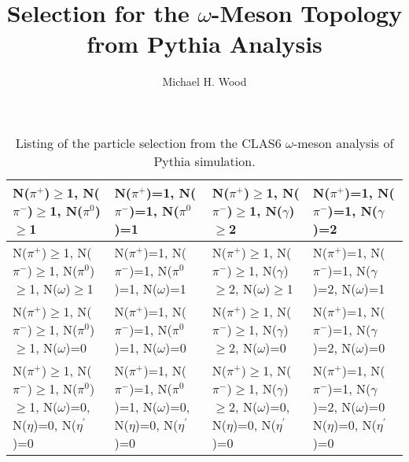 \documentclass[11pt, oneside]{article}   	%
\title{Selection for the $\omega$-Meson Topology from Pythia Analysis}
\author{Michael H. Wood}
\begin{document}
\maketitle

\begin{table}[htp]
\caption{Listing of the particle selection from the CLAS6 $\omega$-meson analysis of Pythia simulation.}
\begin{center}
\begin{tabular}{| p{2.5cm} | p{2.5cm} | p{2.5cm} | p{2.5cm} |}
\hline
N($\pi^{+}$)$\ge$1, N($\pi^{-}$)$\ge$1, N($\pi^{0}$)$\ge$1 & 
N($\pi^{+}$)=1, N($\pi^{-}$)=1, N($\pi^{0}$)=1 & 
N($\pi^{+}$)$\ge$1, N($\pi^{-}$)$\ge$1, N($\gamma$)$\ge$2 & 
N($\pi^{+}$)=1, N($\pi^{-}$)=1, N($\gamma$)=2 \\  \hline \hline

N($\pi^{+}$)$\ge$1, N($\pi^{-}$)$\ge$1, N($\pi^{0}$)$\ge$1, N($\omega$)$\ge$1 & 
N($\pi^{+}$)=1, N($\pi^{-}$)=1, N($\pi^{0}$)=1, N($\omega$)=1 & 
N($\pi^{+}$)$\ge$1, N($\pi^{-}$)$\ge$1, N($\gamma$)$\ge$2, N($\omega$)$\ge$1 & 
N($\pi^{+}$)=1, N($\pi^{-}$)=1, N($\gamma$)=2, N($\omega$)=1 \\  \hline \hline

N($\pi^{+}$)$\ge$1, N($\pi^{-}$)$\ge$1, N($\pi^{0}$)$\ge$1, N($\omega$)=0 & 
N($\pi^{+}$)=1, N($\pi^{-}$)=1, N($\pi^{0}$)=1, N($\omega$)=0 & 
N($\pi^{+}$)$\ge$1, N($\pi^{-}$)$\ge$1, N($\gamma$)$\ge$2, N($\omega$)=0 & 
N($\pi^{+}$)=1, N($\pi^{-}$)=1, N($\gamma$)=2, N($\omega$)=0 \\  \hline \hline

N($\pi^{+}$)$\ge$1, N($\pi^{-}$)$\ge$1, N($\pi^{0}$)$\ge$1, N($\omega$)=0, N($\eta$)=0, N($\eta^{\prime}$)=0 & 
N($\pi^{+}$)=1, N($\pi^{-}$)=1, N($\pi^{0}$)=1, N($\omega$)=0, N($\eta$)=0, N($\eta^{\prime}$)=0 & 
N($\pi^{+}$)$\ge$1, N($\pi^{-}$)$\ge$1, N($\gamma$)$\ge$2, N($\omega$)=0, N($\eta$)=0, N($\eta^{\prime}$)=0 & 
N($\pi^{+}$)=1, N($\pi^{-}$)=1, N($\gamma$)=2, N($\omega$)=0 N($\eta$)=0, N($\eta^{\prime}$)=0 \\  \hline

\hline
\end{tabular}
\end{center}
\label{default}
\end{table}
%

\end{document}
